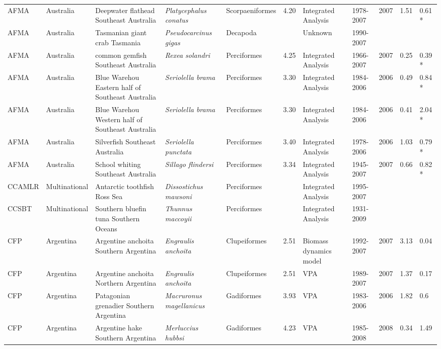 \begin{longtable}{p{1.5cm}p{1.5cm}p{3cm}p{3cm}p{2.5cm}p{0.9cm}p{1.4cm}p{0.9cm}p{0.9cm}p{0.9cm}p{1cm}}
  AFMA & Australia & Deepwater flathead Southeast Australia & \textit{Platycephalus conatus} & Scorpaeniformes & 4.20 & Integrated Analysis & 1978-2007 & 2007 & 1.51 & 0.61 * \\ 
  AFMA & Australia & Tasmanian giant crab Tasmania & \textit{Pseudocarcinus gigas} & Decapoda &  & Unknown & 1990-2007 &  &  &  \\ 
  AFMA & Australia & common gemfish Southeast Australia & \textit{Rexea solandri} & Perciformes & 4.25 & Integrated Analysis & 1966-2007 & 2007 & 0.25 & 0.39 * \\ 
  AFMA & Australia & Blue Warehou Eastern half of Southeast Australia & \textit{Seriolella brama} & Perciformes & 3.30 & Integrated Analysis & 1984-2006 & 2006 & 0.49 & 0.84 * \\ 
  AFMA & Australia & Blue Warehou Western half of Southeast Australia & \textit{Seriolella brama} & Perciformes & 3.30 & Integrated Analysis & 1984-2006 & 2006 & 0.41 & 2.04 * \\ 
  AFMA & Australia & Silverfish Southeast Australia & \textit{Seriolella punctata} & Perciformes & 3.40 & Integrated Analysis & 1978-2006 & 2006 & 1.03 & 0.79 * \\ 
  AFMA & Australia & School whiting Southeast Australia & \textit{Sillago flindersi} & Perciformes & 3.34 & Integrated Analysis & 1945-2007 & 2007 & 0.66 & 0.82 * \\ 
  CCAMLR & Multinational & Antarctic toothfish Ross Sea & \textit{Dissostichus mawsoni} & Perciformes &  & Integrated Analysis & 1995-2007 &  &  &  \\ 
  CCSBT & Multinational & Southern bluefin tuna Southern Oceans & \textit{Thunnus maccoyii} & Perciformes &  & Integrated Analysis & 1931-2009 &  &  &  \\ 
  CFP & Argentina & Argentine anchoita Southern Argentina & \textit{Engraulis anchoita} & Clupeiformes & 2.51 & Biomass dynamics model & 1992-2007 & 2007 & 3.13 & 0.04 \\ 
  CFP & Argentina & Argentine anchoita Northern Argentina & \textit{Engraulis anchoita} & Clupeiformes & 2.51 & VPA & 1989-2007 & 2007 & 1.37 & 0.17 \\ 
  CFP & Argentina & Patagonian grenadier Southern Argentina & \textit{Macruronus magellanicus} & Gadiformes & 3.93 & VPA & 1983-2006 & 2006 & 1.82 & 0.6 \\ 
  CFP & Argentina & Argentine hake Southern Argentina & \textit{Merluccius hubbsi} & Gadiformes & 4.23 & VPA & 1985-2008 & 2008 & 0.34 & 1.49 \\ 

\end{longtable}
